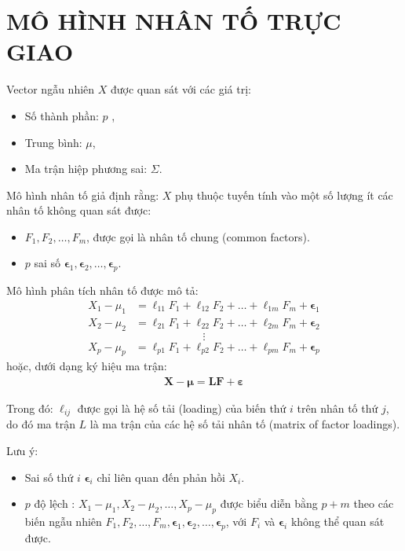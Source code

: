 \documentclass[a4paper]{book}
\begin{document}
\tableofcontents
\chapter{MÔ HÌNH NHÂN TỐ TRỰC GIAO}

Vector ngẫu nhiên \(X\) được quan sát với các giá trị:
\begin{itemize}
\item Số thành phần: \(p\) ,

\item Trung bình: \(\mu\),

\item Ma trận hiệp phương sai: \(\Sigma\).
\end{itemize}
Mô hình nhân tố giả định rằng: \(X\) phụ thuộc tuyến tính vào một số lượng ít các nhân tố không quan sát được:
\begin{itemize}
\item \(F_1, F_2, \ldots, F_m\), được gọi là nhân tố chung (common factors).

\item \(p\) sai số  \(\boldsymbol{\epsilon}_1, \boldsymbol{\epsilon}_2, \ldots, \boldsymbol{\epsilon}_p\).
\end{itemize}
Mô hình phân tích nhân tố được mô tả:
\begin{eqnarray}
X_1 - \mu_1 &= \ell_{11}F_1 + \ell_{12}F_2 + \ldots + \ell_{1m}F_m + \boldsymbol{\epsilon}_1\\
X_2 - \mu_2 &= \ell_{21}F_1 + \ell_{22}F_2 + \ldots + \ell_{2m}F_m + \boldsymbol{\epsilon}_2
\end{eqnarray}
\[\vdots\]
\begin{eqnarray}
X_p - \mu_p &= \ell_{p1}F_1 + \ell_{p2}F_2 + \ldots + \ell_{pm}F_m + \boldsymbol{\epsilon}_p
\end{eqnarray}
hoặc, dưới dạng ký hiệu ma trận:
\begin{eqnarray}
\mathbf{X} - \boldsymbol{\mu} = \mathbf{L}\mathbf{F} + \boldsymbol{\varepsilon}
\end{eqnarray}

Trong đó: \(\ell_{ij}\) được gọi là hệ số tải (loading) của biến thứ \(i\) trên nhân tố thứ \(j\), do đó ma trận \(L\) là ma trận của các hệ số tải nhân tố (matrix of factor loadings).

Lưu ý: 
\begin{itemize}
    \item Sai số thứ \(i\) \(\boldsymbol{\epsilon}_i\) chỉ liên quan đến phản hồi \(X_i\).
    \item \(p\) độ lệch : \(X_1 - \mu_1, X_2 - \mu_2, \ldots, X_p - \mu_p\) được biểu diễn bằng \(p + m\) theo các biến ngẫu nhiên  \(F_1, F_2, \ldots, F_m, \boldsymbol{\epsilon}_1, \boldsymbol{\epsilon}_2, \ldots, \boldsymbol{\epsilon}_p\), với \(F_i\) và \(\boldsymbol{\epsilon}_i\) không thể quan sát được.
\end{itemize}
\end{document}
